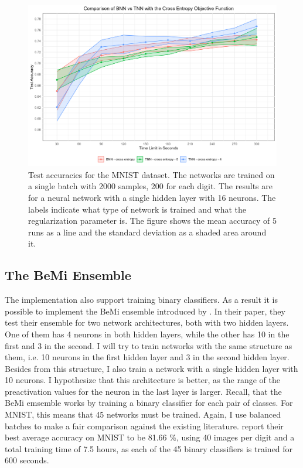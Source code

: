 \begin{figure}[H]
    \centering
    \includegraphics[width=1\linewidth]{Figures/BNN_vs_TNN_cs.png}
    \caption{Test accuracies for the MNIST dataset. The networks are trained on a single batch with 2000 samples, 200 for each digit. The results are for a neural network with a single hidden layer with 16 neurons. The labels indicate what type of network is trained and what the regularization parameter is. The figure shows the mean accuracy of 5 runs as a line and the standard deviation as a shaded area around it.}
    \label{BNN_vs_TNN_cs}
\end{figure}



\subsection{The BeMi Ensemble}
The implementation also support training binary classifiers. As a result it is possible to implement the BeMi ensemble introduced by \cite{ambrogio2023}. In their paper, they test their ensemble for two network architectures, both with two hidden layers. One of them has 4 neurons in both hidden layers, while the other has 10 in the first and 3 in the second. I will try to train networks with the same structure as them, i.e. 10 neurons in the first hidden layer and 3 in the second hidden layer. Besides from this structure, I also train a network with a single hidden layer with 10 neurons. I hypothesize that this architecture is better, as the range of the preactivation values for the neuron in the last layer is larger. Recall, that the BeMi emsemble works by training a binary classifier for each pair of classes. For MNIST, this means that 45 networks must be trained. Again, I use balanced batches to make a fair comparison against the existing literature. \cite{ambrogio2023} report their best average accuracy on MNIST to be 81.66 \%, using 40 images per digit and a total training time of 7.5 hours, as each of the 45 binary classifiers is trained for 600 seconds. \\

